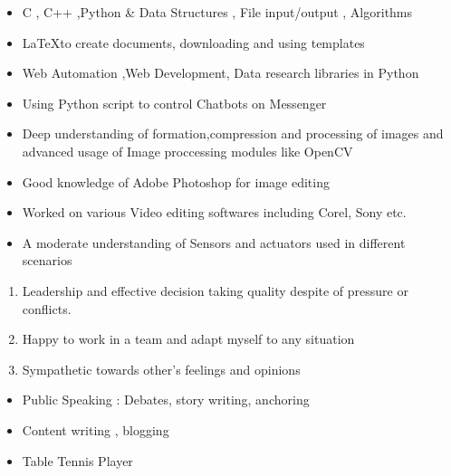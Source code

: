 \documentclass{article}
\begin{document}
	
			\begin{itemize}
			\color{black}	\item C , C++ ,Python \& Data Structures , File input/output , Algorithms
			\color{black}	\item  \LaTeX to create documents, downloading and using templates
			\color{black} \item Web Automation ,Web Development, Data research libraries in Python
			\color{black} \item Using Python script to control  Chatbots on Messenger
			\color{black} \item Deep understanding of formation,compression and processing of images and advanced usage of Image proccessing modules like OpenCV
			\color{black} \item Good knowledge of Adobe Photoshop for image editing
			\color{black} \item Worked on various Video editing softwares including Corel, Sony etc.
			\color{black} \item A moderate understanding of Sensors and actuators used in different scenarios
			
		\end{itemize}
	\begin{enumerate}
		\LARGE
			\color{black}	\item Leadership and effective decision taking quality despite of pressure or conflicts.
		\item  Happy to work in a team and adapt myself to any situation
		\item Sympathetic towards other's feelings and opinions
	\end{enumerate}
\begin{itemize}
	\LARGE
	\color{black}	\item Public Speaking : Debates, story writing, anchoring
	\item Content writing , blogging
	\item Table Tennis Player
\end{itemize}
		

	
\end{document}
